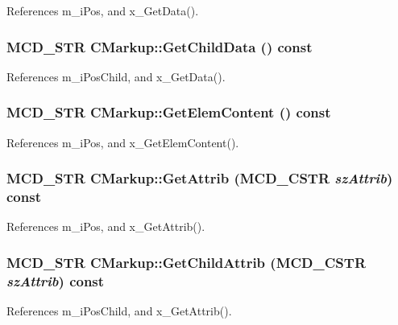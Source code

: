 References m\_\-iPos, and x\_\-GetData().
\subsubsection[GetChildData]{\setlength{\rightskip}{0pt plus 5cm}MCD\_\-STR CMarkup::GetChildData () const\hspace{0.3cm}{\tt  [inline]}}\label{classCMarkup_7b66931cdfa9bf4423aaeb1cb37fa6f5}




References m\_\-iPosChild, and x\_\-GetData().
\subsubsection[GetElemContent]{\setlength{\rightskip}{0pt plus 5cm}MCD\_\-STR CMarkup::GetElemContent () const\hspace{0.3cm}{\tt  [inline]}}\label{classCMarkup_9dfbb66afa75291b5ed19b51e0f6357b}




References m\_\-iPos, and x\_\-GetElemContent().
\subsubsection[GetAttrib]{\setlength{\rightskip}{0pt plus 5cm}MCD\_\-STR CMarkup::GetAttrib ({\bf MCD\_\-CSTR} {\em szAttrib}) const\hspace{0.3cm}{\tt  [inline]}}\label{classCMarkup_de52b4aa36263acc26c8d4f75e8941eb}




References m\_\-iPos, and x\_\-GetAttrib().
\subsubsection[GetChildAttrib]{\setlength{\rightskip}{0pt plus 5cm}MCD\_\-STR CMarkup::GetChildAttrib ({\bf MCD\_\-CSTR} {\em szAttrib}) const\hspace{0.3cm}{\tt  [inline]}}\label{classCMarkup_d617eafd272e9c1b18bcc6c9128815fd}




References m\_\-iPosChild, and x\_\-GetAttrib().
